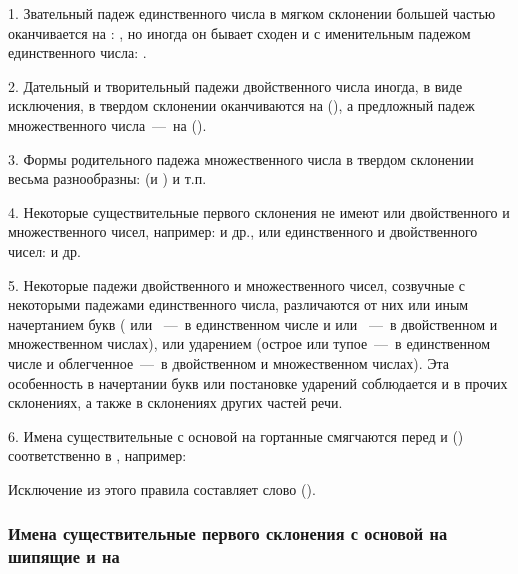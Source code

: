 \documentclass[11pt,a4paper,oneside]{memoir}
\begin{document}
    1. Звательный падеж единственного числа в мягком склонении большей частью оканчивается на {}: {}, но иногда он бывает сходен и с именительным падежом единственного числа: {}.
    
    2. Дательный и творительный падежи двойственного числа иногда, в виде исключения, в твердом склонении оканчиваются на {} ({}), а предложный падеж множественного числа~---~на {} ({}).
    
    3. Формы родительного падежа множественного числа в твердом склонении весьма разнообразны: {} (и {}) и т.п.
    
    4. Некоторые существительные первого склонения не имеют или двойственного и множественного чисел, например: {} и др., или единственного и двойственного чисел: {} и др.
    
    5. Некоторые падежи двойственного и множественного чисел, созвучные с некоторыми падежами единственного числа, различаются от них или иным начертанием букв ({} или {}~---~в единственном числе и {} или {}~---~в двойственном и множественном числах), или ударением (острое или тупое~---~в единственном числе и облегченное~---~в двойственном и множественном числах). Эта особенность в начертании букв или постановке ударений соблюдается и в прочих склонениях, а также в склонениях других частей речи.
    
    6. Имена существительные с основой на гортанные {} смягчаются перед {} и {} ({}) соответственно в {}, например:
    
    \bigskip{}

    Исключение из этого правила составляет слово {} ({}).


                \subsubsection{Имена существительные первого склонения с основой на шипящие и на {}}
\end{document}
